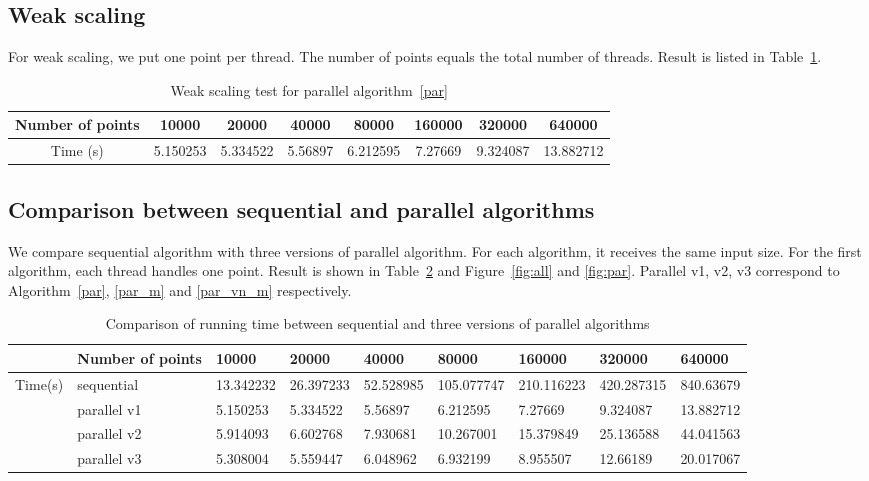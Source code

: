\subsection{Weak scaling}
For weak scaling, we put one point per thread. The number of points equals the total number of threads.
Result is listed in Table~\ref{tab:weak-scaling}.
\begin{table}[ht]
  \centering
  \begin{tabular}{|c|c|c|c|c|c|c|c|}
    \hline
    Number of points	& 10000	& 20000	& 40000	& 80000	& 160000	& 320000	& 640000 \\
    \hline
    Time (s)	& 5.150253	& 5.334522	& 5.56897	& 6.212595	& 7.27669	& 9.324087	& 13.882712 \\
    \hline
  \end{tabular}
  \label{tab:weak-scaling}
  \caption{Weak scaling test for parallel algorithm~\ref{par}}
\end{table}

\subsection{Comparison between sequential and parallel algorithms}
We compare sequential algorithm with three versions of parallel algorithm. For each algorithm, it
receives the same input size. For the first algorithm, each thread handles one point. Result is shown in
Table~\ref{tab:comparison} and Figure~\ref{fig:all} and \ref{fig:par}. Parallel v1, v2, v3 correspond to
Algorithm~\ref{par}, \ref{par_m} and \ref{par_vn_m} respectively.   
\begin{table}[!h]
  \centering
  \begin{tabular}{|p{1cm}|p{1.4cm}|p{1.5cm}|p{1.5cm}|p{1.5cm}|p{1.5cm}|p{1.5cm}|p{1.5cm}|p{1.5cm}|}
    \hline
    & Number of points	& 10000	& 20000	& 40000	& 80000	& 160000	& 320000	& 640000 \\
    \hline
    \multirow{4}{*}{Time(s)}	& sequential	& 13.342232	& 26.397233	& 52.528985	& 105.077747	& 210.116223	& 420.287315	& 840.63679 \\
    \cline{2-9}
	  & parallel v1	& 5.150253	& 5.334522	& 5.56897	& 6.212595	& 7.27669	& 9.324087	& 13.882712 \\
    \cline{2-9}
	  & parallel v2	& 5.914093	& 6.602768	& 7.930681	& 10.267001	& 15.379849	& 25.136588	& 44.041563 \\
    \cline{2-9}
	  & parallel v3	& 5.308004	& 5.559447	& 6.048962	& 6.932199	& 8.955507	& 12.66189	& 20.017067 \\
    \hline
  \end{tabular}
  \label{tab:comparison}
  \caption{Comparison of running time between sequential and three versions of parallel algorithms}
\end{table}

